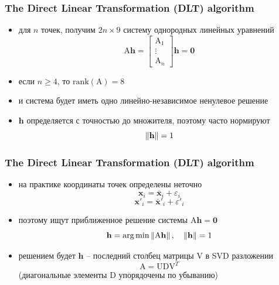 \documentclass[12pt,usepdftitle=false,aspectratio=1610]{beamer}
\DeclarePairedDelimiter{\norm}{\lVert}{\rVert}
\begin{document}
\begin{frame}
\frametitle{The Direct Linear Transformation (DLT) algorithm}
\begin{itemize}
    \item для $n$ точек, получим $2n\times 9$ систему однородных линейных уравнений 
    $$
        \mathrm{A}\mathbf{h}=
        \begin{bmatrix}
            \mathrm{A}_1\\
            \vdots\\
            \mathrm{A}_n
        \end{bmatrix}
        \mathbf{h}=
        \mathbf{0}
    $$
    \item если $n\geqslant 4$, то $\mathrm{rank}(\mathrm{A})=8$
    \item и система будет иметь одно линейно-независимое ненулевое решение
    \item $\mathbf{h}$ определяется с точностью до множителя, поэтому часто нормируют
    $$
    \norm{\mathbf{h}}=1
    $$
\end{itemize}
\end{frame}

\begin{frame}
\frametitle{The Direct Linear Transformation (DLT) algorithm}
\begin{itemize}
    \item на практике координаты точек определены неточно
    $$
        \mathbf{x}_i=\bar{\mathbf{x}}_i+\varepsilon_i
    $$
    $$
        \mathbf{x}'_i=\bar{\mathbf{x}}'_i+\varepsilon'_i
    $$
    \item поэтому ищут приближенное решение системы $\mathrm{A}\mathbf{h}=\mathbf{0}$
    $$
        \mathbf{h}=\arg\min\,
        \norm{\mathrm{A\mathbf{h}}}\,,\quad
        \norm{\mathbf{h}}=1
    $$
    \item решением будет $\mathbf{h}$ -- последний столбец матрицы $\mathrm{V}$ 
          в SVD разложении  
          $$
            \mathrm{A}=\mathrm{U}\mathrm{D}\mathrm{V}^T
          $$
          (диагональные элементы $\mathrm{D}$ упорядочены по убыванию)
\end{itemize}
\end{frame}
\end{document}
